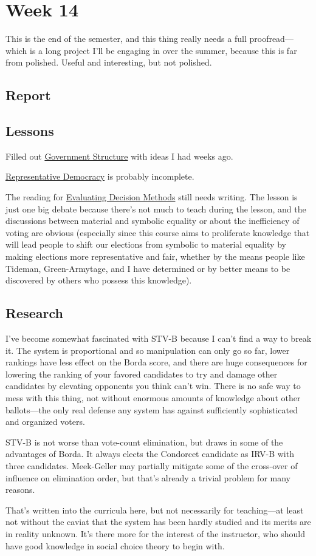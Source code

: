 
\section{Week 14}

This is the end of the semester, and this thing really needs a full proofread—which is a long project I'll be engaging in over the summer, because this is far from polished.  Useful and interesting, but not polished.

\subsection{Report}


\subsection{Lessons}

Filled out \hyperref[cur:government-structure]{Government Structure} with ideas I had weeks ago.

\hyperref[cur:representative-democracy]{Representative Democracy} is probably incomplete.

The reading for \hyperref[cur:evaluating-decision-methods]{Evaluating Decision Methods} still needs writing.  The lesson is just one big debate because there's not much to teach during the lesson, and the discussions between material and symbolic equality or about the inefficiency of voting are obvious (especially since this course aims to proliferate knowledge that will lead people to shift our elections from symbolic to material equality by making elections more representative and fair, whether by the means people like Tideman, Green-Armytage, and I have determined or by better means to be discovered by others who possess this knowledge).

\subsection{Research}

I've become somewhat fascinated with STV-B because I can't find a way to break it.  The system is proportional and so manipulation can only go so far, lower rankings have less effect on the Borda score, and there are huge consequences for lowering the ranking of your favored candidates to try and damage other candidates by elevating opponents you think can't win.  There is no safe way to mess with this thing, not without enormous amounts of knowledge about other ballots—the only real defense any system has against sufficiently sophisticated and organized voters.

STV-B is not worse than vote-count elimination, but draws in some of the advantages of Borda.  It always elects the Condorcet candidate as IRV-B with three candidates.  Meek-Geller may partially mitigate some of the cross-over of influence on elimination order, but that's already a trivial problem for many reasons.

That's written into the curricula here, but not necessarily for teaching—at least not without the caviat that the system has been hardly studied and its merits are in reality unknown.  It's there more for the interest of the instructor, who should have good knowledge in social choice theory to begin with.
